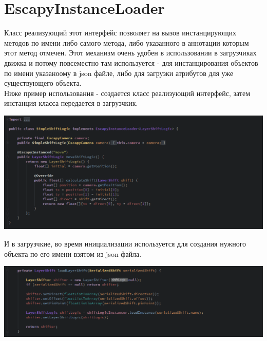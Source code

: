 \documentclass[11pt]{report}
\begin{document}
\section{EscapyInstanceLoader}
Класс реализующий этот интерфейс позволяет на вызов инстанцирующих методов по имени либо самого метода, либо указанного в аннотации которым этот метод отмечен. Этот механизм очень удобен в использовании в загрузчиках движка и потому повсеместно там используется - для инстанцирования объектов по имени указаноому в json файле, либо для загрузки атрибутов для уже существующего объекта. \\Ниже пример использования - создается класс реализующий интерфейс, затем инстанция класса передается в загрузчкик.
\begin{center}
	\includegraphics[width=1.2\linewidth]{img/7.png} 
  	\label{img:7} 
\end{center}
И в загрузчкие, во время инициализации используется для создания нужного объекта по его имени взятом из json файла.
\begin{center}
	\includegraphics[width=1.2\linewidth]{img/8.png} 
  	\label{img:8} 
\end{center}
\end{document}
